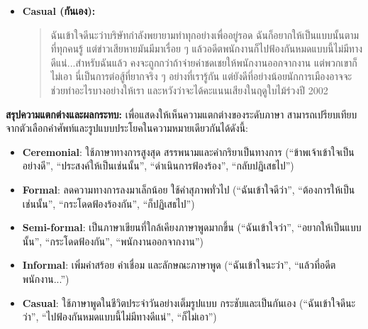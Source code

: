 \begin{itemize}
    \item \textbf{Casual (กันเอง):}
    \begin{quote}
        ฉันเข้าใจดีนะว่าบริษัทกำลังพยายามทำทุกอย่างเพื่ออยู่รอด ฉันก็อยากให้เป็นแบบนั้นตามที่ทุกคนรู้ แต่ข่าวเสียหายมันมีมาเรื่อย ๆ แล้วอดีตพนักงานก็ไปฟ้องกันหมดแบบนี้ไม่มีทางดีแน่...สำหรับฉันแล้ว คงจะถูกกว่าถ้าจ่ายค่าชดเชยให้พนักงานออกจากงาน แต่พวกเขาก็ไม่เอา
        นี่เป็นการต่อสู้ที่ยากจริง ๆ อย่างที่เรารู้กัน แต่ยังดีที่อย่างน้อยนักการเมืองอาจจะช่วยทำอะไรบางอย่างให้เรา และหวังว่าจะได้คะแนนเสียงในฤดูใบไม้ร่วงปี 2002
    \end{quote}
\end{itemize}

\textbf{สรุปความแตกต่างและผลกระทบ:}
เพื่อแสดงให้เห็นความแตกต่างของระดับภาษา สามารถเปรียบเทียบจากตัวเลือกคำศัพท์และรูปแบบประโยคในความหมายเดียวกันได้ดังนี้:
\begin{itemize}
    \item \textbf{Ceremonial}: ใช้ภาษาทางการสูงสุด สรรพนามและคำกริยาเป็นทางการ (``ข้าพเจ้าเข้าใจเป็นอย่างดี'', ``ประสงค์ให้เป็นเช่นนั้น'', ``ดำเนินการฟ้องร้อง'', ``กลับปฏิเสธไป'')
    \item \textbf{Formal}: ลดความทางการลงมาเล็กน้อย ใช้คำสุภาพทั่วไป (``ฉันเข้าใจดีว่า'', ``ต้องการให้เป็นเช่นนั้น'', ``กระโดดฟ้องร้องกัน'', ``ก็ปฏิเสธไป'')
    \item \textbf{Semi-formal}: เป็นภาษาเขียนที่ใกล้เคียงภาษาพูดมากขึ้น (``ฉันเข้าใจว่า'', ``อยากให้เป็นแบบนั้น'', ``กระโดดฟ้องกัน'', ``พนักงานออกจากงาน'')
    \item \textbf{Informal}: เพิ่มคำสร้อย คำเชื่อม และลักษณะภาษาพูด (``ฉันเข้าใจนะว่า'', ``แล้วที่อดีตพนักงาน...'')
    \item \textbf{Casual}: ใช้ภาษาพูดในชีวิตประจำวันอย่างเต็มรูปแบบ กระชับและเป็นกันเอง (``ฉันเข้าใจดีนะว่า'', ``ไปฟ้องกันหมดแบบนี้ไม่มีทางดีแน่'', ``ก็ไม่เอา'')
\end{itemize}


